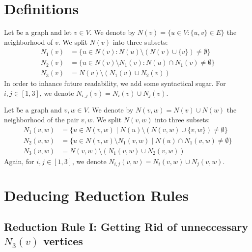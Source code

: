 \section{Definitions}

\begin{definition} \label{def:nv}
    Let \G be a graph and let $v \in V$. We denote by $N(v) = \{u \in V : \{u,v\} \in E \}$ the neighborhood of $v$. We split $N(v)$ into three subsets:
    \begin{align}
    N_1(v) &= \{u \in N(v) : N(u) \setminus (N(v)\cup \{v\}) \neq \emptyset \} \\
    N_2(v) &= \{u \in N(v)\setminus N_1(v) : N(u) \cap N_1(v) \neq \emptyset \} \\
    N_3(v) &= N(v) \setminus (N_1(v) \cup N_2(v))
    \end{align}
    In order to inhance future readability, we add some syntactical sugar.  For $i,j \in [1,3]$, we denote $N_{i,j} (v) = N_i(v) \cup N_j(v)$.
\end{definition}
    
\begin{definition}
    Let \G be a graph and $v,w \in V$. We denote by $N(v,w) = N(v) \cup N(w)$ the neighborhood of the pair $v,w$. We split $N(v,w)$ into three subsets:
    \begin{align}
    N_1(v,w) &= \{u \in N(v,w) \mid N(u) \setminus (N(v,w)\cup \{v,w\}) \neq \emptyset \} \\
    N_2(v,w) &= \{u \in N(v,w)\setminus N_1(v,w) \mid N(u) \cap N_1(v,w) \neq \emptyset \}\\
    N_3(v,w) &=  N(v,w) \setminus (N_1(v,w) \cup N_2(v,w))
    \end{align}
    Again, for $i,j \in [1,3]$, we denote $N_{i,j}(v,w) = N_i(v,w) \cup N_j(v,w)$.
\end{definition}

\section{Deducing Reduction Rules}

\subsection{Reduction Rule I: Getting Rid of unneccessary  $N_3(v)$ vertices}

